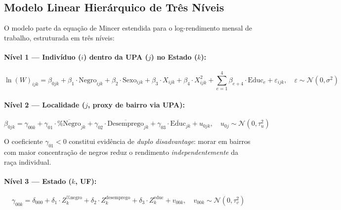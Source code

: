 \documentclass[12pt, a4paper, oneside]{article}
\begin{document}
\subsection{Modelo Linear Hierárquico de Três Níveis}
\label{subsec:hlm}

O modelo parte da equação de Mincer estendida para o log-rendimento
mensal de trabalho, estruturada em três níveis:

\paragraph{Nível 1 --- Indivíduo ($i$) dentro da UPA ($j$) no Estado ($k$):}
\begin{equation}
  \ln(W)_{ijk} = \beta_{0jk}
    + \beta_1 \cdot \text{Negro}_{ijk}
    + \beta_2 \cdot \text{Sexo}_{ijk}
    + \beta_3 \cdot X_{ijk}
    + \beta_4 \cdot X^2_{ijk}
    + \sum_{e=1}^{4} \beta_{e+4} \cdot \text{Educ}_e
    + \varepsilon_{ijk}, \quad \varepsilon \sim \mathcal{N}(0,\sigma^2)
  \label{eq:nivel1}
\end{equation}

\paragraph{Nível 2 --- Localidade ($j$, proxy de bairro via UPA):}
\begin{equation}
  \beta_{0jk} = \gamma_{00k}
    + \gamma_{01} \cdot \overline{\%\text{Negro}}_{jk}
    + \gamma_{02} \cdot \overline{\text{Desemprego}}_{jk}
    + \gamma_{03} \cdot \overline{\text{Educ}}_{jk}
    + u_{0jk}, \quad u_{0j} \sim \mathcal{N}(0, \tau^2_u)
  \label{eq:nivel2}
\end{equation}

O coeficiente $\gamma_{01} < 0$ constitui evidência de \textit{duplo disadvantage}:
morar em bairros com maior concentração de negros reduz o rendimento
\textit{independentemente} da raça individual.

\paragraph{Nível 3 --- Estado ($k$, UF):}
\begin{equation}
  \gamma_{00k} = \delta_{000}
    + \delta_1 \cdot Z_k^{\%\text{negro}}
    + \delta_2 \cdot Z_k^{\text{desemprego}}
    + \delta_3 \cdot Z_k^{\text{educ}}
    + v_{00k}, \quad v_{00k} \sim \mathcal{N}(0, \tau^2_v)
  \label{eq:nivel3}
\end{equation}
\end{document}
